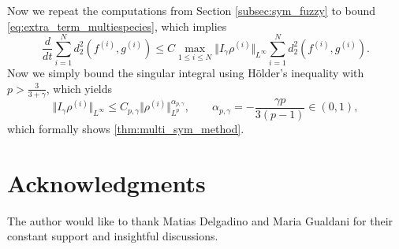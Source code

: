 \documentclass[10pt,oneside]{amsart}
\numberwithin{equation}{section}
\numberwithin{definition}{section}
\numberwithin{theorem}{section}
\numberwithin{lemma}{section}
\begin{document}
% 
Now we repeat the computations from Section \ref{subsec:sym_fuzzy} to bound \cref{eq:extra_term_multiespecies},
which implies
%
\begin{equation*}
  \frac{d}{dt}\sum_{i=1}^Nd_2^2(f^{(i)},g^{(i)}) \leq C\max_{1\leq i\leq N}\Vert I_{\gamma}\rho^{(i)}\Vert _{L^{\infty}}\sum_{i=1}^Nd_2^2(f^{(i)},g^{(i)}).
\end{equation*}
%
Now we simply bound the singular integral using Hölder's inequality with $p>\frac{3}{3+\gamma}$, which yields
%
\begin{equation*}
  \Vert I_{\gamma}\rho^{(i)}\Vert _{L^{\infty}} \leq 
  C_{p,\gamma}\Vert \rho^{(i)}\Vert _{L^{p}}^{\alpha_{p,\gamma}},\qquad
  \alpha_{p,\gamma}=-\frac{\gamma p}{3(p-1)}\in (0,1),
\end{equation*}
%
which formally shows \cref{thm:multi_sym_method}.

\section*{Acknowledgments}
The author would like to thank Matias Delgadino and Maria Gualdani for their constant support and insightful discussions.

  
  
\end{document}
